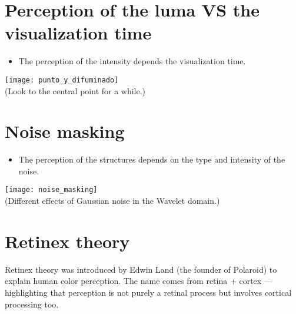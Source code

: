 \section{Perception of the luma VS the visualization time}
\begin{itemize}
\item The perception of the intensity depends the visualization time.
\end{itemize}
\begin{center}
  \texttt{[image: punto\_y\_difuminado]}\\
  (Look to the central point for a while.)
\end{center}

\section{Noise masking}
\begin{itemize}
\item The perception of the structures depends on the type and intensity of the noise.
\end{itemize}
\begin{center}
  \texttt{[image: noise\_masking]}\\
  (Different effects of Gaussian noise in the Wavelet domain.)
\end{center}

\section{Retinex theory}

Retinex theory was introduced by Edwin Land (the founder of Polaroid)
to explain human color perception. The name comes from retina + cortex
— highlighting that perception is not purely a retinal process but
involves cortical processing too.

